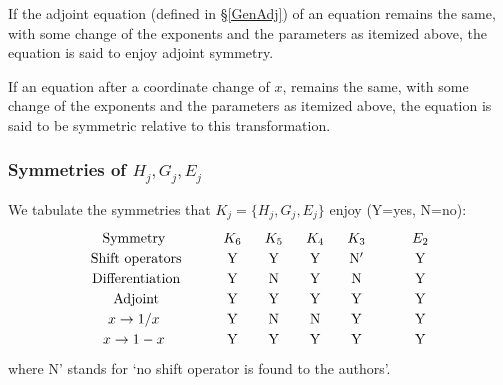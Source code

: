 \documentclass[a4paper,12pt]{article}
\theoremstyle{definition}
\theoremstyle{remark}
\numberwithin{equation}{section} %
\begin{document}
     If the adjoint equation (defined in \S \ref{GenAdj}) of an equation remains the same, with some change of the exponents and the parameters as itemized above,  the equation is said to enjoy adjoint symmetry.

 If an equation after a coordinate change of $x$, remains the same, with some change of the exponents and the parameters as itemized  above, 
        the equation is said to be symmetric relative to this transformation.

\subsubsection{Symmetries of $H_j,G_j,E_j$}
   We tabulate the symmetries that $K_j=\{H_j,G_j,E_j\}$ enjoy (Y=yes, N=no):
   \[ \def\arraystretch{1.2}
   \begin{array}{ccccccc}
   \text{Symmetry }&\ &\ K_{6}\ &\ K_{5}\ &\ K_{4}\ &\ K_3\ &\qquad E_2 \\
{\rm Shift\ operators} &\ \ &{\rm Y}&{\rm Y}&{\rm Y}&{\rm N'}&\qquad{\rm Y}\\
{\rm Differentiation} &\ &{\rm Y}&{\rm N}&{\rm Y}&{\rm N}&\qquad{\rm Y}\\
{\rm Adjoint} &\ \ &{\rm Y}&{\rm Y}&{\rm Y}&{\rm Y}&\qquad{\rm Y}\\
x\to1/x \ &\   &{\rm Y}&{\rm N}&{\rm N}&{\rm Y}&\qquad{\rm Y}\\
x\to1-x \  &\ &{\rm Y}&{\rm Y}&{\rm Y}&{\rm Y}&\qquad{\rm Y}
\end{array}
\]
where N' stands for `no shift operator is found to the authors'.
\end{document}
